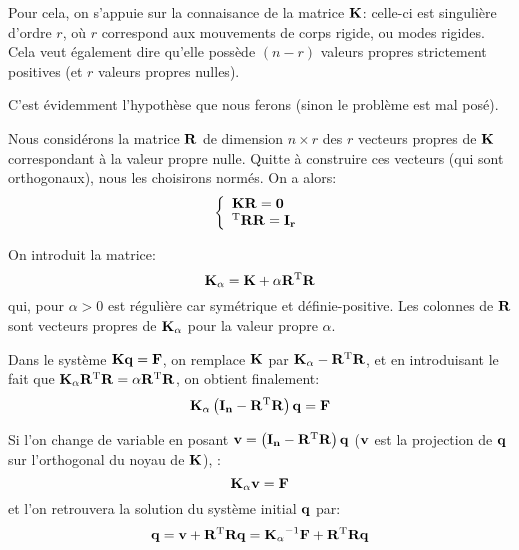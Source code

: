 Pour cela, on s'appuie sur la connaisance de la matrice $\mathbf{K}$: celle-ci est singulière d'ordre
$r$, où $r$ correspond aux mouvements de corps rigide, ou modes rigides. Cela veut
également dire qu'elle possède $(n-r)$ valeurs propres strictement positives (et $r$ valeurs 
propres nulles).

 C'est évidemment l'hypothèse que
nous ferons (sinon le problème est mal posé).

\medskip
Nous considérons la matrice $\mathbf{R}$ de dimension $n\times r$ des $r$ vecteurs propres de $\mathbf{K}$
correspondant à la valeur propre nulle. Quitte à construire ces vecteurs (qui sont orthogonaux),
nous les choisirons normés. On a alors:
\begin{equation}
\left\{
\begin{array}{l}
\mathbf{K}\mathbf{R}=\mathbf{0}\\
{}^\mathrm{T}\mathbf{R}\mathbf{R}=\mathbf{I_r}
\end{array}
\right.
\end{equation}

On introduit la matrice:
\begin{equation} \mathbf{K_\alpha} = \mathbf{K}+\alpha \mathbf{R}{}^\mathrm{T}\mathbf{R} \end{equation}
qui, pour $\alpha>0$ est régulière car symétrique et définie-positive.
Les colonnes de $\mathbf{R}$ sont vecteurs propres de $\mathbf{K_\alpha}$ pour la valeur propre $\alpha$.

Dans le système $\mathbf{K}\mathbf{q}=\mathbf{F}$, on remplace $\mathbf{K}$ par $\mathbf{K_\alpha}-\mathbf{R}{}^\mathrm{T}\mathbf{R}$, et en introduisant le
fait que $\mathbf{K_\alpha}\mathbf{R}{}^\mathrm{T}\mathbf{R}=\alpha \mathbf{R}{}^\mathrm{T}\mathbf{R}$, on obtient finalement:
\begin{equation}
\mathbf{K_\alpha} \left(\mathbf{I_n}-\mathbf{R}{}^\mathrm{T}\mathbf{R}\right)\mathbf{q}=\mathbf{F}
\end{equation}

Si l'on change de variable en posant $\mathbf{v}=\left(\mathbf{I_n}-\mathbf{R}{}^\mathrm{T}\mathbf{R}\right)\mathbf{q}$ ($\mathbf{v}$ est la projection de 
$\mathbf{q}$ sur l'orthogonal du noyau de $\mathbf{K}$), :
\begin{equation}
\mathbf{K_\alpha}\mathbf{v}=\mathbf{F}
\end{equation}
et l'on retrouvera la solution du système initial $\mathbf{q}$ par:
\begin{equation}\mathbf{q}=\mathbf{v}+\mathbf{R}{}^\mathrm{T}\mathbf{R}\mathbf{q} = \mathbf{K_\alpha}^{-1}\mathbf{F}+\mathbf{R}{}^\mathrm{T}\mathbf{R}\mathbf{q}\end{equation}

